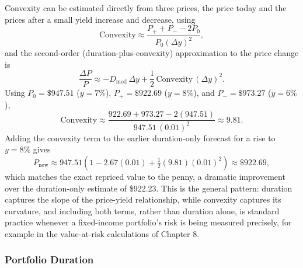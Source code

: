 \documentclass[../ai_in_finance]{subfiles}
\begin{document}
Convexity can be estimated directly from three prices, the price today and the prices after a small yield increase and decrease, using
\begin{equation*}
\text{Convexity} \approx \frac{P_{+} + P_{-} - 2P_0}{P_0 (\Delta y)^2},
\end{equation*}
and the second-order (duration-plus-convexity) approximation to the price change is
\begin{equation*}
\frac{\Delta P}{P} \approx -D_{\text{mod}} \, \Delta y + \frac{1}{2}\,\text{Convexity} \,(\Delta y)^2.
\end{equation*}
Using $P_0 = \$947.51$ ($y{=}7\%$), $P_{+} = \$922.69$ ($y{=}8\%$), and $P_{-} = \$973.27$ ($y{=}6\%$),
\begin{equation*}
\text{Convexity} \approx \frac{922.69 + 973.27 - 2(947.51)}{947.51 \,(0.01)^2} \approx 9.81.
\end{equation*}
Adding the convexity term to the earlier duration-only forecast for a rise to $y=8\%$ gives
\begin{equation*}
P_{\text{new}} \approx 947.51\left(1 - 2.67(0.01) + \tfrac{1}{2}(9.81)(0.01)^2\right) \approx \$922.69,
\end{equation*}
which matches the exact repriced value to the penny, a dramatic improvement over the duration-only estimate of \$922.23. This is the general pattern: duration captures the slope of the price-yield relationship, while convexity captures its curvature, and including both terms, rather than duration alone, is standard practice whenever a fixed-income portfolio's risk is being measured precisely, for example in the value-at-risk calculations of Chapter 8.

\subsubsection*{Portfolio Duration}
\end{document}
